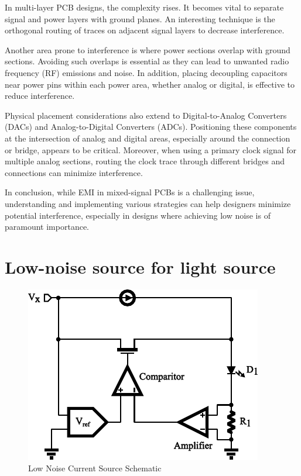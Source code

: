 In multi-layer PCB designs, the complexity rises. It becomes vital to separate signal and power layers with ground planes. An interesting technique is the orthogonal routing of traces on adjacent signal layers to decrease interference.

Another area prone to interference is where power sections overlap with ground sections. Avoiding such overlaps is essential as they can lead to unwanted radio frequency (RF) emissions and noise. In addition, placing decoupling capacitors near power pins within each power area, whether analog or digital, is effective to reduce interference.

Physical placement considerations also extend to Digital-to-Analog Converters (DACs) and Analog-to-Digital Converters (ADCs). Positioning these components at the intersection of analog and digital areas, especially around the connection or bridge, appears to be critical. Moreover, when using a primary clock signal for multiple analog sections, routing the clock trace through different bridges and connections can minimize interference.

In conclusion, while EMI in mixed-signal PCBs is a challenging issue, understanding and implementing various strategies can help designers minimize potential interference, especially in designs where achieving low noise is of paramount importance.


\section{Low-noise source for light source}

\begin{figure}[H]
\centerline{\includegraphics[width=0.6\linewidth]{3-literature/LowNoiseCurrentSourceSch.pdf}}
\caption{Low Noise Current Source Schematic}
\label{fig_LowNoiseCurrentSourceSch}
\end{figure}

